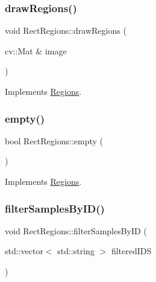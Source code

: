 \subsubsection{\texorpdfstring{draw\+Regions()}{drawRegions()}}
{\footnotesize\ttfamily void Rect\+Regions\+::draw\+Regions (\begin{DoxyParamCaption}\item[{cv\+::\+Mat \&}]{image }\end{DoxyParamCaption})\hspace{0.3cm}{\ttfamily [virtual]}}



Implements \hyperlink{struct_regions_adab32a2a00fc77abb6f4876939dc8505}{Regions}.

\mbox{\label{struct_rect_regions_a4ec356e30d899d9a49fce3fe95f73d34}} 
\subsubsection{\texorpdfstring{empty()}{empty()}}
{\footnotesize\ttfamily bool Rect\+Regions\+::empty (\begin{DoxyParamCaption}{ }\end{DoxyParamCaption})\hspace{0.3cm}{\ttfamily [virtual]}}



Implements \hyperlink{struct_regions_a5763d0526981f665356ac35734e8e505}{Regions}.

\mbox{\label{struct_rect_regions_a8eff732b9c2308dae4e0ff45f147cb51}} 
\subsubsection{\texorpdfstring{filter\+Samples\+By\+I\+D()}{filterSamplesByID()}}
{\footnotesize\ttfamily void Rect\+Regions\+::filter\+Samples\+By\+ID (\begin{DoxyParamCaption}\item[{std\+::vector$<$ std\+::string $>$}]{filtered\+I\+DS }\end{DoxyParamCaption})\hspace{0.3cm}{\ttfamily [virtual]}}



